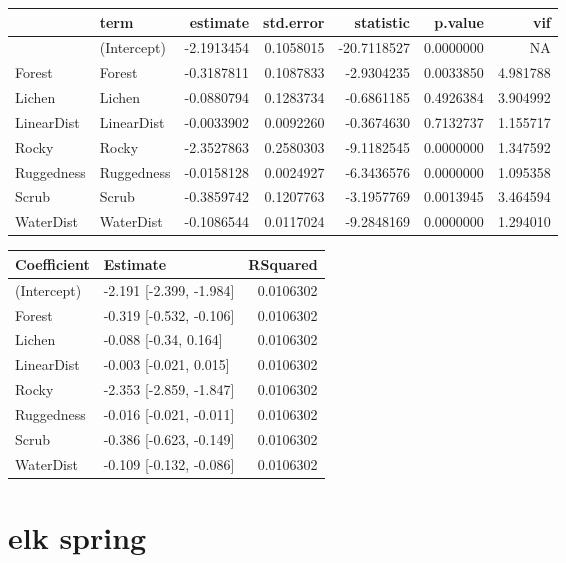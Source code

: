 \documentclass[]{article}
\begin{document}
\begin{tabular}{llrrrrr}
\toprule
  & term & estimate & std.error & statistic & p.value & vif\\
\midrule
 & (Intercept) & -2.1913454 & 0.1058015 & -20.7118527 & 0.0000000 & NA\\
Forest & Forest & -0.3187811 & 0.1087833 & -2.9304235 & 0.0033850 & 4.981788\\
Lichen & Lichen & -0.0880794 & 0.1283734 & -0.6861185 & 0.4926384 & 3.904992\\
LinearDist & LinearDist & -0.0033902 & 0.0092260 & -0.3674630 & 0.7132737 & 1.155717\\
Rocky & Rocky & -2.3527863 & 0.2580303 & -9.1182545 & 0.0000000 & 1.347592\\
Ruggedness & Ruggedness & -0.0158128 & 0.0024927 & -6.3436576 & 0.0000000 & 1.095358\\
Scrub & Scrub & -0.3859742 & 0.1207763 & -3.1957769 & 0.0013945 & 3.464594\\
WaterDist & WaterDist & -0.1086544 & 0.0117024 & -9.2848169 & 0.0000000 & 1.294010\\
\bottomrule
\end{tabular}

\begin{tabular}{llr}
\toprule
Coefficient & Estimate & RSquared\\
\midrule
(Intercept) & -2.191 [-2.399, -1.984] & 0.0106302\\
Forest & -0.319 [-0.532, -0.106] & 0.0106302\\
Lichen & -0.088 [-0.34, 0.164] & 0.0106302\\
LinearDist & -0.003 [-0.021, 0.015] & 0.0106302\\
Rocky & -2.353 [-2.859, -1.847] & 0.0106302\\
Ruggedness & -0.016 [-0.021, -0.011] & 0.0106302\\
Scrub & -0.386 [-0.623, -0.149] & 0.0106302\\
WaterDist & -0.109 [-0.132, -0.086] & 0.0106302\\
\bottomrule
\end{tabular}

\section{elk spring}\label{elk-spring}
\end{document}
